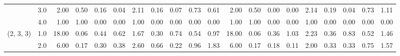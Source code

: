 \begin{tabular}{llrrrrrrrrrrrrrrrrrr}
          & 3.0 &               2.00 &                     0.50 &                                 0.16 &                             0.04 &                           2.11 &                                               0.16 &                                            0.07 &                                            0.73 &                                        0.61 &               2.00 &                     0.50 &                                 0.00 &                             0.00 &                           2.14 &                                               0.19 &                                            0.04 &                                            0.73 &                                        1.11 \\
          & 4.0 &               1.00 &                     1.00 &                                 0.00 &                             0.00 &                           1.00 &                                               0.00 &                                            0.00 &                                            0.00 &                                        0.00 &               1.00 &                     1.00 &                                 0.00 &                             0.00 &                           1.00 &                                               0.00 &                                            0.00 &                                            0.00 &                                        0.00 \\
(2, 3, 3) & 1.0 &              18.00 &                     0.06 &                                 0.44 &                             0.62 &                           1.67 &                                               0.30 &                                            0.74 &                                            0.54 &                                        0.97 &              18.00 &                     0.06 &                                 0.36 &                             1.03 &                           2.23 &                                               0.36 &                                            0.83 &                                            0.52 &                                        1.46 \\
          & 2.0 &               6.00 &                     0.17 &                                 0.30 &                             0.38 &                           2.60 &                                               0.66 &                                            0.22 &                                            0.96 &                                        1.83 &               6.00 &                     0.17 &                                 0.18 &                             0.11 &                           2.00 &                                               0.33 &                                            0.33 &                                            0.75 &                                        1.57 \\

\end{tabular}
